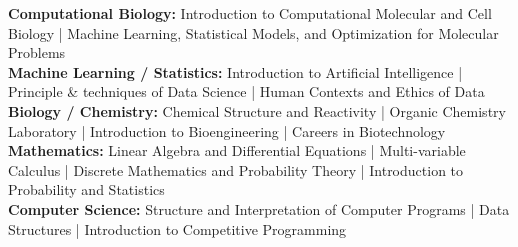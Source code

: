 \newcommand{\coursework}[2]{
    \vspace{4pt}
    \textbf{#1:} #2 \\
}

\coursework{Computational Biology}{Introduction to Computational Molecular and Cell Biology | Machine Learning, Statistical Models, and Optimization for Molecular Problems}

\coursework{Machine Learning / Statistics}{Introduction to Artificial Intelligence | Principle \& techniques of Data Science | Human Contexts and Ethics of Data}

\coursework{Biology / Chemistry}{Chemical Structure and Reactivity | Organic Chemistry Laboratory | Introduction to Bioengineering | Careers in Biotechnology}

\coursework{Mathematics}{Linear Algebra and Differential Equations | Multi-variable Calculus | Discrete Mathematics and Probability Theory | Introduction to Probability and Statistics}

\coursework{Computer Science}{Structure and Interpretation of Computer Programs | Data Structures | Introduction to Competitive Programming}
